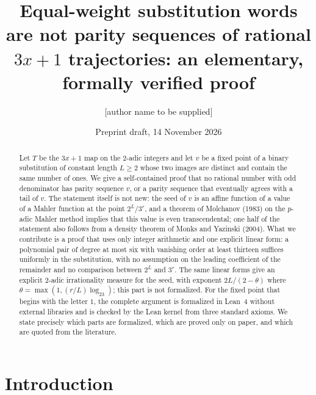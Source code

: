 \documentclass[11pt,reqno]{amsart}
\theoremstyle{definition}
\theoremstyle{remark}
\newcommand{\paperauthor}{[author name to be supplied]}
\begin{document}
\title[Equal-weight substitution words and rational $3x+1$ trajectories]%
{Equal-weight substitution words are not parity sequences of rational
$3x+1$ trajectories: an elementary, formally verified proof}

\author{\paperauthor}

\date{Preprint draft, 14 November 2026}



\begin{abstract}
Let $T$ be the $3x+1$ map on the $2$-adic integers and let $v$ be a
fixed point of a binary substitution of constant length $L\ge 2$ whose two
images are distinct and contain the same number of ones.  We give a
self-contained proof that no rational number with odd denominator has
parity sequence $v$, or a parity sequence that eventually agrees with a
tail of $v$.  The statement itself is not new: the seed of $v$ is an affine
function of a value of a Mahler function at the point $2^L/3^r$, and a
theorem of Molchanov (1983) on the $p$-adic Mahler method implies that this
value is even transcendental; one half of the statement also follows from a
density theorem of Monks and Yazinski (2004).  What we contribute is a
proof that uses only integer arithmetic and one explicit linear form: a
polynomial pair of degree at most six with vanishing order at least
thirteen suffices uniformly in the substitution, with no assumption on the
leading coefficient of the remainder and no comparison between $2^L$ and
$3^r$.  The same linear forms give an explicit $2$-adic irrationality
measure for the seed, with exponent $2L/(2-\theta)$ where
$\theta=\max(1,(r/L)\log_23)$; this part is not formalized.  For the fixed
point that begins with the letter $1$, the complete argument is formalized in Lean~4 without external libraries and is checked
by the Lean kernel from three standard axioms.  We state precisely which
parts are formalized, which are proved only on paper, and which are quoted
from the literature.
\end{abstract}

\maketitle

\section{Introduction}
\end{document}
